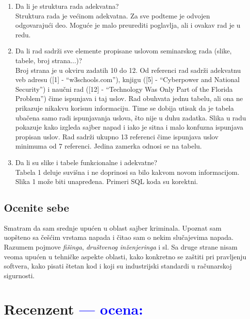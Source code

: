 \documentclass[a4paper]{report}
\newcommand{\odgovor}[1]{\textcolor{blue}{#1}}
\begin{document}
\begin{enumerate}
\item Da li je struktura rada adekvatna?\\
Struktura rada je većinom adekvatna. Za sve podteme je odvojen odgovarajući deo. Moguće je malo preurediti poglavlja, ali i ovakav rad je u redu.

\item Da li rad sadrži sve elemente propisane uslovom seminarskog rada (slike, tabele, broj strana...)?\\
Broj strana je u okviru zadatih 10 do 12. Od referenci rad sadrži adekvatnu veb adresu ([1] - ``w3schools.com''), knjigu ([5] - ``Cyberpower and National Security'') i naučni rad ([12] - ``Technology Was Only Part of the Florida Problem'') čime ispunjava i taj uslov.
Rad obuhvata jednu tabelu, ali ona ne prikazuje nikakvu korisnu informaciju. Time se dobija utisak da je tabela ubačena samo radi ispunjavanja uslova, što nije u duhu zadatka. Slika u radu pokazuje kako izgleda sajber napad i iako je sitna i malo konfuzna ispunjava propisan uslov.
Rad sadrži ukupno 13 referenci čime ispunjava uslov minimuma od 7 referenci. Jedina zamerka odnosi se na tabelu.

\item Da li su slike i tabele funkcionalne i adekvatne?\\
Tabela 1 deluje suvišna i ne doprinosi sa bilo kakvom novom informacijom. Slika 1 može biti unapređena. Primeri SQL koda su korektni.

\end{enumerate}

\section{Ocenite sebe}
Smatram da sam srednje upućen u oblast sajber kriminala. Upoznat sam uopšteno sa češćim vrstama napada i čitao sam o nekim slučajevima napada. Razumem pojmove \textit{fišinga}, \textit{društvenog inženjeringa} i sl. Sa druge strane nisam veoma upućen u tehničke aspekte oblasti, kako konkretno se zaštiti pri pravljenju softvera, kako pisati štetan kod i koji su industrijski standardi u računarskoj sigurnosti.


\chapter{Recenzent \odgovor{--- ocena:} }
\end{document}
